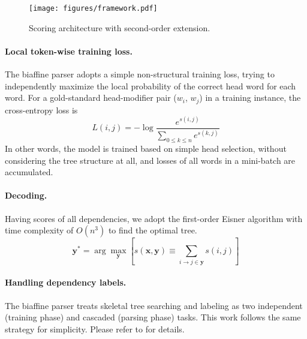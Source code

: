 \documentclass[11pt,a4paper]{article}
\begin{document}
\begin{figure}[tb]
\centering
\texttt{[image: figures/framework.pdf]}
\caption{Scoring architecture with second-order extension.
}
\label{fig:framework}
\end{figure}

\paragraph{Local token-wise training loss.}
The biaffine parser adopts a simple non-structural training loss,
trying to independently maximize the local probability of the correct head word for each word.
For a gold-standard head-modifier pair ($w_i$, $w_j$)
in a training instance,
the cross-entropy loss is
\begin{equation} \label{equation:biaffine-loss}
\mathit{L}(i,j) = -\log{\frac{e^{s(i,j)}}{\sum_{0 \le k \le n} e^{s(k,j)}}}
\end{equation}
In other words, the model is trained based on simple head selection,
without considering the tree structure at all, and
losses of all words in a mini-batch are accumulated.

\paragraph{Decoding.} Having scores of all dependencies,
we adopt the first-order Eisner algorithm with time complexity of $O(n^3)$
to find the optimal tree.
\begin{equation}
\label{equation:map-decoding}
{\boldsymbol{y}}^* = \arg\max_{\boldsymbol{y}} \left[ s(\boldsymbol{x},\boldsymbol{y}) \equiv
\sum_{i \rightarrow j \in \boldsymbol{y}}{s(i,j)} \right]
\end{equation}


\paragraph{Handling dependency labels.}
The biaffine parser treats skeletal tree searching and labeling as two independent (training phase) and cascaded (parsing phase) tasks.
This work follows the same strategy for simplicity. Please refer to \citet{Timothy-d17-biaffine} for details.










%
 
\end{document}
